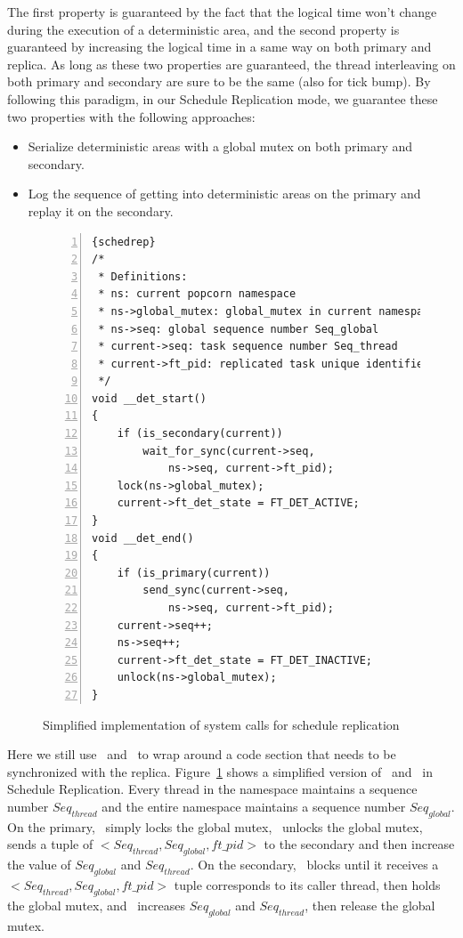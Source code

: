 The first property is guaranteed by the fact that the logical time won't change during the execution of a deterministic area, and the second property is guaranteed by increasing the logical time in a same way on both primary and replica. As long as these two properties are guaranteed, the thread interleaving on both primary and secondary are sure to be the same (also for tick bump). By following this paradigm, in our Schedule Replication mode, we guarantee these two properties with the following approaches:

\begin{itemize}
\item Serialize deterministic areas with a global mutex on both primary and secondary.
\item Log the sequence of getting into deterministic areas on the primary and replay it on the secondary.
\end{itemize}

\begin{figure}
\begin{lstlisting}[numbers=left, frame=single, basicstyle=\small, breaklines]{schedrep}
/*
 * Definitions:
 * ns: current popcorn namespace
 * ns->global_mutex: global_mutex in current namespace
 * ns->seq: global sequence number Seq_global
 * current->seq: task sequence number Seq_thread
 * current->ft_pid: replicated task unique identifier
 */
void __det_start()
{
    if (is_secondary(current))
        wait_for_sync(current->seq, 
            ns->seq, current->ft_pid);
    lock(ns->global_mutex);
    current->ft_det_state = FT_DET_ACTIVE;
}
void __det_end()
{
    if (is_primary(current))
        send_sync(current->seq, 
            ns->seq, current->ft_pid);
    current->seq++;
    ns->seq++;
    current->ft_det_state = FT_DET_INACTIVE;
    unlock(ns->global_mutex);
}
\end{lstlisting}
\caption{Simplified implementation of system calls for schedule replication}
\label{f:schedrep_c}
\end{figure}


Here we still use \detstart\ and \detend\ to wrap around a code section that needs to be synchronized with the replica. Figure~\ref{f:schedrep_c} shows a simplified version of \detstart\ and \detend\ in Schedule Replication.  Every thread in the namespace maintains a sequence number $Seq_{thread}$ and the entire namespace maintains a sequence number $Seq_{global}$. On the primary, \detstart\ simply locks the global mutex, \detend\ unlocks the global mutex, sends a tuple of $< Seq_{thread}, Seq_{global}, ft\_pid >$ to the secondary and then increase the value of $Seq_{global}$ and $Seq_{thread}$. On the secondary, \detstart\ blocks until it receives a $< Seq_{thread}, Seq_{global}, ft\_pid >$ tuple corresponds to its caller thread, then holds the global mutex, and \detend\ increases $Seq_{global}$ and $Seq_{thread}$, then release the global mutex.

